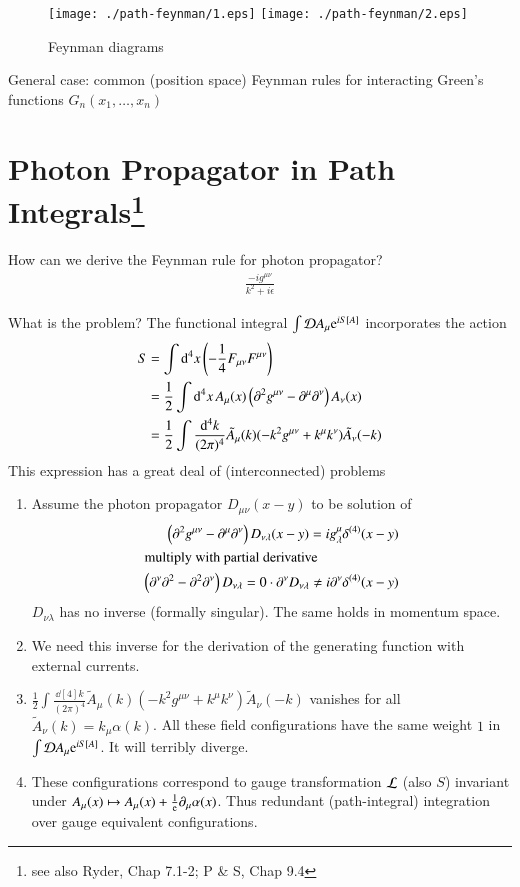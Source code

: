 \begin{figure}[ht]
   \centering
   \texttt{[image: ./path-feynman/1.eps]}%
   \texttt{[image: ./path-feynman/2.eps]}
   \caption{Feynman diagrams}
\end{figure}

General case: common (position space) Feynman rules for interacting Green's functions $G_n (x_1, \dots, x_n)$

\section[Photon Propagator in Path Integrals]{Photon Propagator in Path Integrals\footnote{see also Ryder, Chap 7.1-2; P \& S, Chap 9.4}}
How can we derive the Feynman rule for photon propagator?
\begin{align}
   \frac{-ig^{\mu\nu}}{k^2 + i \epsilon}
\end{align}

What is the problem? The functional integral $\int \mathcal{D} A_\mu \mathrm{e}^{iS[A]}$ incorporates the action
\begin{align}
   S &= \int \dd[4]{x} \left( - \frac{1}{4} F_{\mu\nu} F^{\mu\nu} \right) \notag\\ 
     &= \frac{1}{2} \int \dd[4]{x} A_\mu(x) \left( \partial^2 g^{\mu\nu} - \partial^{\mu} \partial^\nu \right) A_\nu(x) \notag\\
     &= \frac{1}{2} \int \frac{\dd[4]{k}}{(2\pi)^4} \tilde{A}_\mu (k) (-k^2 g^{\mu\nu} + k^\mu k^\nu) \tilde{A}_\nu (-k) 
\end{align}
This expression has a great deal of (interconnected) problems
\begin{enumerate}
   \item Assume the photon propagator $D_{\mu\nu} (x-y)$ to be solution of
         \begin{align*}
            \left( \partial^2 g^{\mu\nu} - \partial^\mu \partial^\nu \right)D_{\nu\lambda} (x-y) = i g^\mu_\lambda \delta^{(4)}(x-y) \\
            \shortintertext{multiply with partial derivative}
            \left( \partial^\nu \partial^2 - \partial^2 \partial^\nu \right) D_{\nu\lambda} = 0 \cdot \partial^\nu D_{\nu\lambda} \neq i \partial^\nu \delta^{(4)} (x-y)
         \end{align*}
         $D_{\nu\lambda}$ has no inverse (formally singular). The same holds in momentum space.
      \item We need this inverse for the derivation of the generating function with external currents.
      \item $\frac{1}{2} \int \frac{\dd[4]{k}}{(2\pi)^4} \tilde{A}_\mu (k) (-k^2 g^{\mu\nu} + k^\mu k^\nu) \tilde{A}_\nu (-k)$ vanishes for all $\tilde{A}_\nu(k) = k_\mu \alpha(k)$.
         All these field configurations have the same weight $1$ in $\int \mathcal{D} A_\mu \mathrm{e}^{iS[A]}$. It will terribly diverge. 
      \item These configurations correspond to gauge transformation $\mathcal{L}$ (also $S$) invariant under $A_\mu(x) \mapsto A_\mu(x) + \frac{1}{\mathrm{e}} \partial_\mu \alpha(x) $. 
         Thus redundant (path-integral) integration over gauge equivalent configurations.
\end{enumerate}

